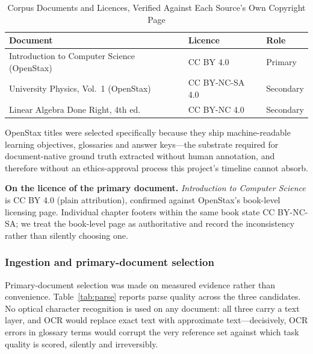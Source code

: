 \documentclass[conference]{IEEEtran}
\begin{document}
\begin{table}[!t]
\caption{Corpus Documents and Licences, Verified Against Each Source's Own
Copyright Page}
\label{tab:corpus}
\centering
\renewcommand{\arraystretch}{1.2}
\begin{tabular}{@{}p{3.5cm}p{2.4cm}p{1.4cm}@{}}
\toprule
\textbf{Document} & \textbf{Licence} & \textbf{Role} \\
\midrule
Introduction to Computer Science (OpenStax) & CC BY 4.0 & Primary \\
University Physics, Vol.~1 (OpenStax) & CC BY-NC-SA 4.0 & Secondary \\
Linear Algebra Done Right, 4th ed. & CC BY-NC 4.0 & Secondary \\
\bottomrule
\end{tabular}
\end{table}

OpenStax titles were selected specifically because they ship
machine-readable learning objectives, glossaries and answer keys---the
substrate required for document-native ground truth extracted without human
annotation, and therefore without an ethics-approval process this project's
timeline cannot absorb.

\noindent\textbf{On the licence of the primary document.}
\emph{Introduction to Computer Science} is CC BY 4.0 (plain attribution),
confirmed against OpenStax's book-level licensing page. Individual chapter
footers within the same book state CC BY-NC-SA; we treat the book-level page
as authoritative and record the inconsistency rather than silently choosing
one.

\subsubsection{Ingestion and primary-document selection}
Primary-document selection was made on measured evidence rather than
convenience. Table~\ref{tab:parse} reports parse quality across the three
candidates. No optical character recognition is used on any document: all
three carry a text layer, and OCR would replace exact text with approximate
text---decisively, OCR errors in glossary terms would corrupt the very
reference set against which task quality is scored, silently and
irreversibly.
\end{document}
